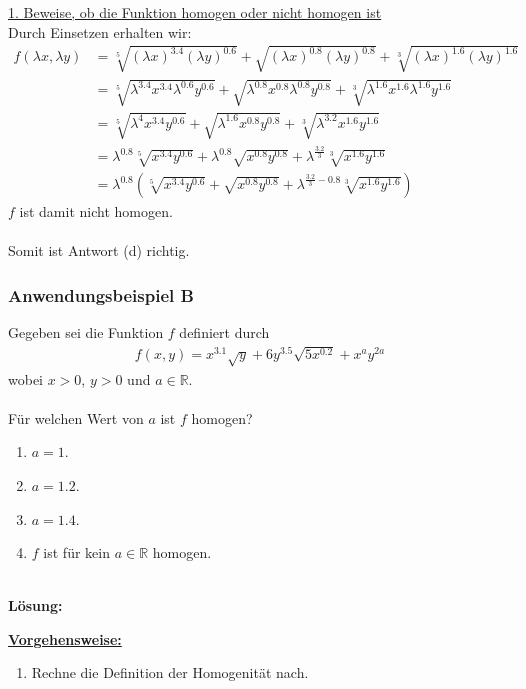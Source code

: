 \underline{1. Beweise, ob die Funktion homogen oder nicht homogen ist}\\
Durch Einsetzen erhalten wir:
\begin{align*}
f( \lambda x, \lambda y ) 
&= \sqrt[5]{(\lambda x)^{3.4} (\lambda y)^{0.6}}
  + \sqrt{(\lambda x)^{0.8} (\lambda y)^{0.8}}
  + \sqrt[3]{(\lambda x)^{1.6} (\lambda y)^{1.6}}\\
&=  \sqrt[5]{\lambda^{3.4} x^{3.4} \lambda^{0.6} y^{0.6}}
  + \sqrt{\lambda^{0.8} x^{0.8} \lambda^{0.8} y^{0.8}}
  + \sqrt[3]{\lambda^{1.6} x^{1.6} \lambda^{1.6} y^{1.6}}\\
&=  \sqrt[5]{\lambda^{4} x^{3.4} y^{0.6}}
  + \sqrt{\lambda^{1.6} x^{0.8}  y^{0.8}}
  + \sqrt[3]{\lambda^{3.2} x^{1.6} y^{1.6}}\\
&=  \lambda^{0.8} \sqrt[5]{ x^{3.4} y^{0.6}}
  + \lambda^{0.8} \sqrt{ x^{0.8}  y^{0.8}}
  + \lambda^{\frac{3.2}{3}} \sqrt[3]{ x^{1.6} y^{1.6}}\\
&=  \lambda^{0.8} \left( \sqrt[5]{ x^{3.4} y^{0.6}}
  + \sqrt{ x^{0.8}  y^{0.8}}
  + \lambda^{\frac{3.2}{3} -0.8} \sqrt[3]{ x^{1.6} y^{1.6}} \right)
\end{align*}
$f$ ist damit nicht homogen.\\
\\
Somit ist Antwort (d) richtig.

\newpage
\subsubsection*{Anwendungsbeispiel B}
Gegeben sei die Funktion $f$ definiert durch
\begin{align*}
f(x,y) = x^{3.1} \sqrt{y} + 6 y^{3.5} \sqrt{ 5 x^{0.2}}
		+ x^a y^{2a}
\end{align*}
wobei $x > 0 $, $ y >0 $ und $a \in \mathbb{R}$.\\ \\
Für welchen Wert von $a$ ist $f$ homogen?
\renewcommand{\labelenumi}{(\alph{enumi})}
\begin{enumerate}
\item $a = 1$.
\item $a = 1.2$.
\item $a = 1.4$.
\item $f$ ist für kein $a \in \mathbb{R}$ homogen.
	
\end{enumerate}
\ \\
\textbf{Lösung:}
\begin{mdframed}
\underline{\textbf{Vorgehensweise:}}
\renewcommand{\labelenumi}{\theenumi.}
\begin{enumerate}
\item Rechne die Definition der Homogenität nach.
\end{enumerate}
\end{mdframed}

